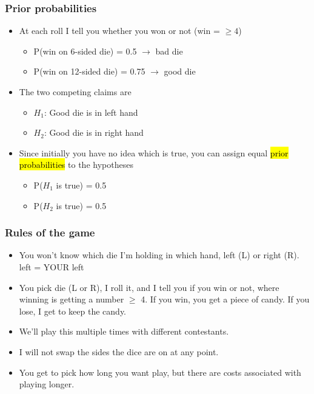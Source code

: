 \documentclass[slidestop,compress,mathserif,12pt,t,professionalfonts,xcolor=table]{beamer}
\begin{document}
\begin{frame}
\frametitle{Prior probabilities}

\begin{itemize}

\item At each roll I tell you whether you won or not (win = $\ge 4$)
\begin{itemize}
\item P(win on 6-sided die) = 0.5 $\rightarrow$ bad die
\item P(win on 12-sided die) = 0.75 $\rightarrow$ good die
\end{itemize}

\pause

\item The two competing claims are
\begin{itemize}
\item[] $H_1$: Good die is in left hand
\item[] $H_2$: Good die is in right hand
\end{itemize}

\pause

\item Since initially you have no idea which is true, you can assign equal \hl{prior probabilities} to the hypotheses
\begin{itemize}
\item[] P($H_1$ is true) = 0.5 
\item[] P($H_2$ is true) = 0.5 
\end{itemize}

\end{itemize}

\end{frame}


\begin{frame}
\frametitle{Rules of the game}

\begin{itemize}

\item You won't know which die I'm holding in which hand, left (L) or right (R). {\footnotesize left = YOUR left}

\pause

\item You pick die (L or R), I roll it, and I tell you if you win or not, where winning is getting a number $\ge$ 4. If you win, you get a piece of candy. If you lose, I get to keep the candy.

\pause

\item We'll play this multiple times with different contestants.

\pause

\item I will not swap the sides the dice are on at any point.

\pause

\item You get to pick how long you want play, but there are costs associated with playing longer.
\end{itemize}

\end{frame}
\end{document}
